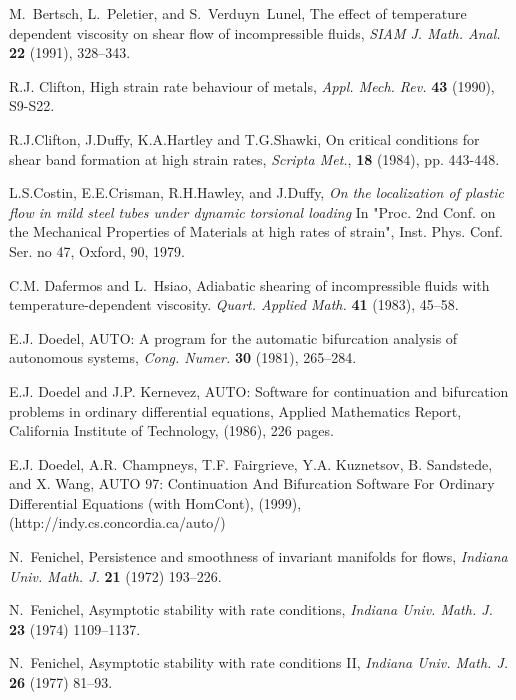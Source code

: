 \documentclass[usletter,11pt]{article}
\theoremstyle{remark}
\begin{document}
\begin{thebibliography}{10}

{\sc M.~Bertsch, L.~Peletier, and S.~Verduyn~Lunel},
The effect of temperature dependent viscosity on shear flow of  incompressible fluids,
{\it SIAM J. Math. Anal.} {\bf 22 } (1991), 328--343.

{\sc R.J. Clifton},  High strain rate behaviour of metals,
{\it Appl. Mech. Rev.}
{\bf 43} (1990), S9-S22.

{\sc R.J.Clifton, J.Duffy, K.A.Hartley and T.G.Shawki},
{ On critical conditions for shear band formation at high strain rates}, {\it Scripta Met.}, {\bf 18} (1984), pp. 443-448.

{\sc L.S.Costin, E.E.Crisman, R.H.Hawley, and J.Duffy},
{\sl On the localization of plastic flow in mild steel tubes under dynamic torsional loading}
 In "Proc. 2nd Conf. on the Mechanical Properties of Materials at high rates of strain",  
 Inst. Phys. Conf. Ser. no 47, Oxford, 90, 1979.

{\sc C.M. Dafermos and L.~Hsiao},
Adiabatic shearing of incompressible fluids with temperature-dependent viscosity.
{\it Quart.  Applied Math.} {\bf 41} (1983), 45--58.


{\sc E.J. Doedel}, AUTO: A program for the automatic bifurcation analysis of autonomous systems, {\it Cong. Numer.} {\bf 30} (1981), 265--284.

{\sc E.J. Doedel and J.P. Kernevez}, AUTO: Software for continuation and bifurcation problems in ordinary differential equations, Applied Mathematics Report, California Institute of Technology, (1986), 226 pages.

{\sc E.J. Doedel, A.R. Champneys,  T.F. Fairgrieve, Y.A. Kuznetsov, B. Sandstede, and X. Wang}, AUTO 97: Continuation And Bifurcation Software For Ordinary Differential Equations (with HomCont), (1999), (http://indy.cs.concordia.ca/auto/)


{\sc N.~Fenichel},
Persistence and smoothness of invariant manifolds for  flows,
{\it Indiana Univ. Math. J.} {\bf 21} (1972) 193--226.

{\sc N.~Fenichel},
Asymptotic stability with rate conditions,
{\it Indiana Univ. Math. J.} {\bf 23} (1974) 1109--1137.

{\sc N.~Fenichel},
Asymptotic stability with rate conditions \textrm{II},
{\it Indiana Univ. Math. J.} {\bf 26} (1977) 81--93.


\end{thebibliography}
\end{document}
